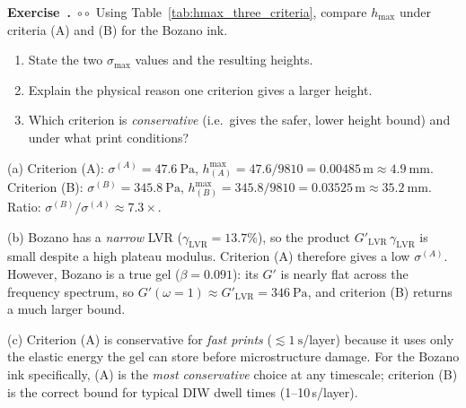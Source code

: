 \documentclass[11pt,a4paper]{article}
\newcommand{\diffB}{\textcolor{orange!80!black}{$\circ\circ$}}
\newcounter{exidx}[section]
\renewcommand{\theexidx}{\thesection.\arabic{exidx}}
\newenvironment{exercise}[1]%
  {\par\smallskip\refstepcounter{exidx}%
   \noindent\textbf{Exercise~\theexidx}~#1\quad}
  {\par\smallskip}
\begin{document}
\begin{exercise}{\diffB}
Using Table~\ref{tab:hmax_three_criteria}, compare $h_\mathrm{max}$ under
criteria (A) and (B) for the Bozano ink.
\begin{enumerate}[label=(\alph*),leftmargin=1.8em,itemsep=2pt]
\item State the two $\sigma_\mathrm{max}$ values and the resulting heights.
\item Explain the physical reason one criterion gives a larger height.
\item Which criterion is \emph{conservative} (i.e.\ gives the safer,
  lower height bound) and under what print conditions?
\end{enumerate}
\end{exercise}
\begin{solution}
(a) Criterion (A): $\sigma^{(A)}=\SI{47.6}{\Pa}$,
$h^{\max}_{(A)}=47.6/9810=0.00485\,\si{\m}\approx\SI{4.9}{\mm}$.
Criterion (B): $\sigma^{(B)}=\SI{345.8}{\Pa}$,
$h^{\max}_{(B)}=345.8/9810=0.03525\,\si{\m}\approx\SI{35.2}{\mm}$.
Ratio: $\sigma^{(B)}/\sigma^{(A)}\approx7.3\times$.

(b) Bozano has a \emph{narrow} LVR ($\gamma_\mathrm{LVR}=13.7\%$), so
the product $G'_\mathrm{LVR}\,\gamma_\mathrm{LVR}$ is small despite a
high plateau modulus.  Criterion (A) therefore gives a low
$\sigma^{(A)}$.  However, Bozano is a true gel ($\beta=0.091$): its
$G'$ is nearly flat across the frequency spectrum, so
$G'(\omega=1)\approx G'_\mathrm{LVR}=\SI{346}{\Pa}$, and criterion (B)
returns a much larger bound.

(c) Criterion (A) is conservative for \emph{fast prints} ($\lesssim\SI{1}{\s}$/layer)
because it uses only the elastic energy the gel can store before
microstructure damage.  For the Bozano ink specifically, (A) is the
\emph{most conservative} choice at any timescale; criterion (B) is the
correct bound for typical DIW dwell times (1--10\,\si{\s}/layer).
\end{solution}
\end{document}
